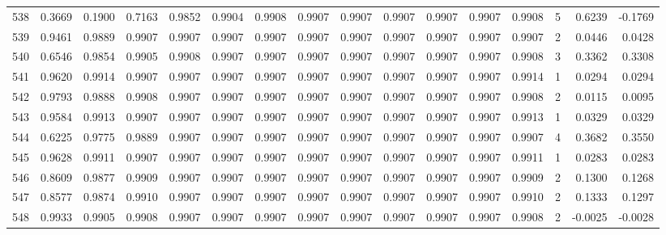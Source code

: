 \begin{tabular}{lrrrrrrrrrrrrrrr}
538 &      0.3669 &  0.1900 &  0.7163 &  0.9852 &  0.9904 &  0.9908 &  0.9907 &  0.9907 &  0.9907 &  0.9907 &   0.9907 &     0.9908 &      5 &                    0.6239 &                    -0.1769 \\
539 &      0.9461 &  0.9889 &  0.9907 &  0.9907 &  0.9907 &  0.9907 &  0.9907 &  0.9907 &  0.9907 &  0.9907 &   0.9907 &     0.9907 &      2 &                    0.0446 &                     0.0428 \\
540 &      0.6546 &  0.9854 &  0.9905 &  0.9908 &  0.9907 &  0.9907 &  0.9907 &  0.9907 &  0.9907 &  0.9907 &   0.9907 &     0.9908 &      3 &                    0.3362 &                     0.3308 \\
541 &      0.9620 &  0.9914 &  0.9907 &  0.9907 &  0.9907 &  0.9907 &  0.9907 &  0.9907 &  0.9907 &  0.9907 &   0.9907 &     0.9914 &      1 &                    0.0294 &                     0.0294 \\
542 &      0.9793 &  0.9888 &  0.9908 &  0.9907 &  0.9907 &  0.9907 &  0.9907 &  0.9907 &  0.9907 &  0.9907 &   0.9907 &     0.9908 &      2 &                    0.0115 &                     0.0095 \\
543 &      0.9584 &  0.9913 &  0.9907 &  0.9907 &  0.9907 &  0.9907 &  0.9907 &  0.9907 &  0.9907 &  0.9907 &   0.9907 &     0.9913 &      1 &                    0.0329 &                     0.0329 \\
544 &      0.6225 &  0.9775 &  0.9889 &  0.9907 &  0.9907 &  0.9907 &  0.9907 &  0.9907 &  0.9907 &  0.9907 &   0.9907 &     0.9907 &      4 &                    0.3682 &                     0.3550 \\
545 &      0.9628 &  0.9911 &  0.9907 &  0.9907 &  0.9907 &  0.9907 &  0.9907 &  0.9907 &  0.9907 &  0.9907 &   0.9907 &     0.9911 &      1 &                    0.0283 &                     0.0283 \\
546 &      0.8609 &  0.9877 &  0.9909 &  0.9907 &  0.9907 &  0.9907 &  0.9907 &  0.9907 &  0.9907 &  0.9907 &   0.9907 &     0.9909 &      2 &                    0.1300 &                     0.1268 \\
547 &      0.8577 &  0.9874 &  0.9910 &  0.9907 &  0.9907 &  0.9907 &  0.9907 &  0.9907 &  0.9907 &  0.9907 &   0.9907 &     0.9910 &      2 &                    0.1333 &                     0.1297 \\
548 &      0.9933 &  0.9905 &  0.9908 &  0.9907 &  0.9907 &  0.9907 &  0.9907 &  0.9907 &  0.9907 &  0.9907 &   0.9907 &     0.9908 &      2 &                   -0.0025 &                    -0.0028 \\

\end{tabular}
